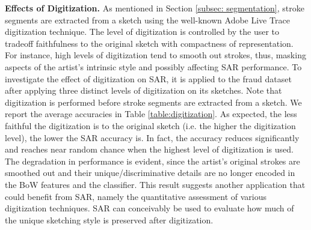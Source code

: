 \noindent\textbf{Effects of Digitization.} As mentioned in Section \ref{subsec: segmentation}, stroke segments are extracted from a sketch using the well-known Adobe Live Trace digitization technique. The level of digitization is controlled by the user to tradeoff faithfulness to the original sketch with compactness of representation. For instance, high levels of digitization tend to smooth out strokes, thus, masking aspects of the artist's intrinsic style and possibly affecting SAR performance. To investigate the effect of digitization on SAR, it is applied to the fraud dataset after applying three distinct levels of digitization on its sketches. Note that digitization is performed before stroke segments are extracted from a sketch. We report the average accuracies in Table \ref{table:digitization}. As expected, the less faithful the digitization is to the original sketch (i.e. the higher the digitization level), the lower the SAR accuracy is. In fact, the accuracy reduces significantly and reaches near random chance when the highest level of digitization is used. The degradation in performance is evident, since the artist's original strokes are smoothed out and their unique/discriminative details are no longer encoded in the BoW features and the classifier. This result suggests another application that could benefit from SAR, namely the quantitative assessment of various digitization techniques. SAR can conceivably be used to evaluate how much of the unique sketching style is preserved after digitization.


